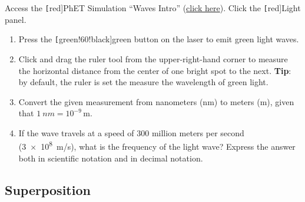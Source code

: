 \documentclass{article}
\numberwithin{equation}{section}
\numberwithin{figure}{section}
\begin{document}
\begin{exercise} \label{3zl6SU}
    Access the \texttt[red]{PhET Simulation} ``Waves Intro'' (\href{https://phet.colorado.edu/sims/html/waves-intro/latest/waves-intro_en.html}{click here}). Click the \texttt[red]{Light} panel. 

    \begin{enumerate}
    \setlength\itemsep{0.1ex}
        \item Press the \texttt[green!60!black]{green} button on the laser to emit green light waves.
        \item Click and drag the ruler tool from the upper-right-hand corner to measure the horizontal distance from the center of one bright spot to the next. \textbf{Tip}: by default, the ruler is set the measure the wavelength of green light.
        \item Convert the given measurement from nanometers (nm) to meters (m), given that $\SI{1}{nm} = 10^{-9}\,\text{m}$.
        \item If the wave travels at a speed of 300 million meters per second (\SI{3e8}{m/s}), what is the frequency of the light wave? Express the answer both in scientific notation and in decimal notation.
    \end{enumerate}


\end{exercise}

\cyanhrule


\subsection{Superposition} \label{96T5dZ}
\end{document}
